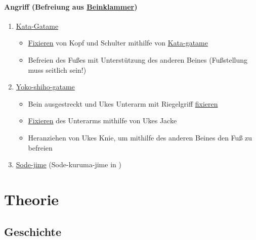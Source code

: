 \documentclass[justified, a4paper, notitlepage, captions=tableheading, nobib]{tufte-handout}
\begin{document}
\paragraph{Angriff (Befreiung aus \hyperref[org8562ca1]{Beinklammer})}
\label{sec:orgb86f0db}
\begin{enumerate}
\item \hyperref[org977aeb7]{Kata-Gatame}
\begin{itemize}
\item \hyperref[org62822f6]{Fixieren} von Kopf und Schulter mithilfe von \hyperref[org977aeb7]{Kata-gatame}
\item Befreien des Fußes mit Unterstützung des anderen Beines (Fußstellung muss seitlich sein!)
\end{itemize}
\item \hyperref[orgb26bb0a]{Yoko-shiho-gatame} \citep[S. 46]{kashiwazaki1998newaza}
\begin{itemize}
\item Bein ausgestreckt und Ukes Unterarm mit Riegelgriff \hyperref[org62822f6]{fixieren}
\item \hyperref[org62822f6]{Fixieren} des Unterarms mithilfe von Ukes Jacke
\item Heranziehen von Ukes Knie, um mithilfe des anderen Beines den Fuß zu befreien
\end{itemize}
\item \hyperref[org9269882]{Sode-jime} (Sode-kuruma-jime in \citep[S. 127]{komuro2011komlock})
\end{enumerate}

\newpage
\section{Theorie }
\label{sec:org5b6a5f2}
\subsection{Geschichte}
\label{sec:org526f67f}
\end{document}
